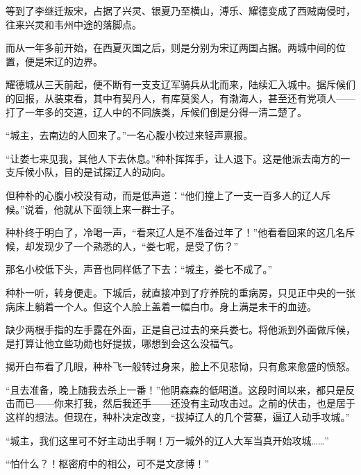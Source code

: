 等到了李继迁叛宋，占据了兴灵、银夏乃至横山，溥乐、耀德变成了西贼南侵时，往来兴灵和韦州中途的落脚点。

而从一年多前开始，在西夏灭国之后，则是分别为宋辽两国占据。两城中间的位置，便是宋辽的边界。

耀德城从三天前起，便不断有一支支辽军骑兵从北而来，陆续汇入城中。据斥候们的回报，从装束看，其中有契丹人，有库莫奚人，有渤海人，甚至还有党项人——打了一年多的交道，辽人中的不同族类，斥候们倒是分得一清二楚了。

“城主，去南边的人回来了。”一名心腹小校过来轻声禀报。

“让娄七来见我，其他人下去休息。”种朴挥挥手，让人退下。这是他派去南方的一支斥候小队，目的是试探辽人的动向。

但种朴的心腹小校没有动，而是低声道：“他们撞上了一支一百多人的辽人斥候。”说着，他就从下面领上来一群士子。

种朴终于明白了，冷喝一声，“看来辽人是不准备过年了！”他看看回来的这几名斥候，却发现少了一个熟悉的人，“娄七呢，是受了伤？”

那名小校低下头，声音也同样低了下去：“城主，娄七不成了。”

种朴一听，转身便走。下城后，就直接冲到了疗养院的重病房，只见正中央的一张病床上躺着一个人。但这个人脸上盖着一幅白巾。身上满是未干的血迹。

缺少两根手指的左手露在外面，正是自己过去的亲兵娄七。将他派到外面做斥候，是打算让他立些功勋也好提拔，哪想到会这么没福气。

揭开白布看了几眼，种朴飞一般转过身来，脸上不见悲恸，只有愈来愈盛的愤怒。

“且去准备，晚上随我去杀上一番！”他阴森森的低喝道。这段时间以来，都只是反击而已——你来打我，然后我还手——还没有主动攻击过。之前的伏击，也是居于这样的想法。但现在，种朴决定改变，“拔掉辽人的几个营寨，逼辽人动手攻城。”

“城主，我们这里可不好主动出手啊！万一城外的辽人大军当真开始攻城……”

“怕什么？！枢密府中的相公，可不是文彦博！”

